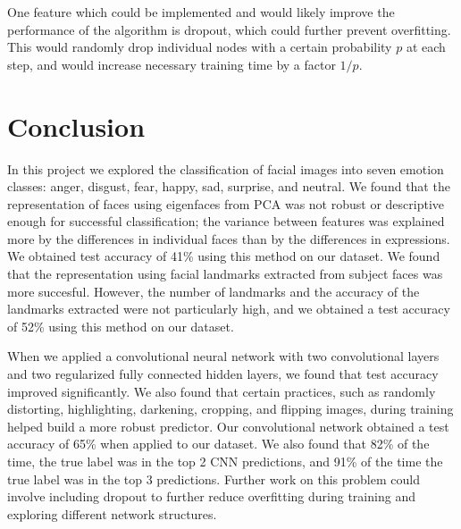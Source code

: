 \documentclass[10pt, twocolumn, twoside]{article}
\begin{document}
One feature which could be implemented and would likely improve the performance of the algorithm is dropout, which could further prevent overfitting. This would randomly drop individual nodes with a certain probability $p$ at each step, and would increase necessary training time by a factor $1/p$.

\section{Conclusion}
In this project we explored the classification of facial images into seven emotion classes: anger, disgust,
fear, happy, sad, surprise, and neutral. We found that the representation of faces using eigenfaces from
PCA was not robust or descriptive enough for successful classification; the variance between features was
explained more by the differences in individual faces than by the differences in expressions. We obtained
test accuracy of 41\% using this method on our dataset. We found that the representation using facial
landmarks extracted from subject faces was more succesful. However, the number of landmarks and the accuracy
of the landmarks extracted were not particularly high, and we obtained a test accuracy of 52\% using this
method on our dataset.

When we applied a convolutional neural network with two convolutional layers and two regularized fully
connected hidden layers, we found that test accuracy improved significantly. We also found that certain
practices, such as randomly distorting, highlighting, darkening, cropping, and flipping images, during
training helped build a more robust predictor. Our convolutional network obtained a test accuracy of 65\%
when applied to our dataset. We also found that 82\% of the time, the true label was in the top 2 CNN
predictions, and 91\% of the time the true label was in the top 3 predictions. Further work on this
problem could involve including dropout to further reduce overfitting during training and exploring
different network structures.
\end{document}
